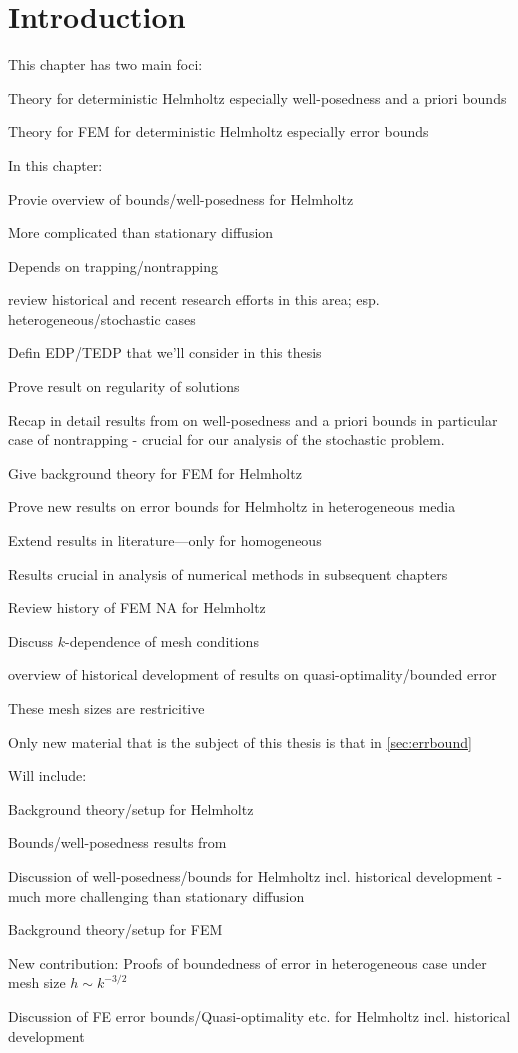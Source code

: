 \section{Introduction}
This chapter has two main foci:
\ben
\item Theory for deterministic Helmholtz especially well-posedness and a priori bounds
\item Theory for FEM for deterministic Helmholtz especially error bounds
  \een

In this chapter:
\bit
\item Provie overview of bounds/well-posedness for Helmholtz
\bit
\item More complicated than stationary diffusion
\item Depends on trapping/nontrapping
\item review historical and recent research efforts in this area; esp. heterogeneous/stochastic cases
\eit
\item Defin EDP/TEDP that we'll consider in this thesis
\item Prove result on regularity of solutions
\item Recap in detail results from \cite{GrPeSp:19} on well-posedness and a priori bounds in particular case of nontrapping - crucial for our analysis of the stochastic problem.
\item Give background theory for FEM for Helmholtz
\item Prove new results on error bounds for Helmholtz in heterogeneous media
  \bit
\item Extend results in literature---only for homogeneous
\item Results crucial in analysis of numerical methods in subsequent chapters
\eit
\item Review history of FEM NA for Helmholtz
\bit
\item Discuss $k$-dependence of mesh conditions
\item  overview of historical development of results on quasi-optimality/bounded error
\item These mesh sizes are restricitive
\eit


Only new material that is the subject of this thesis is that in \cref{sec:errbound}
\eit

Will include:
\bit
\item Background theory/setup for Helmholtz
\item Bounds/well-posedness results from \cite{GrPeSp:19}
\item Discussion of well-posedness/bounds for Helmholtz incl. historical development - much more challenging than stationary diffusion
\item Background theory/setup for FEM
\item New contribution: Proofs of boundedness of error in heterogeneous case under mesh size $h \sim k^{-3/2}$
\item Discussion of FE error bounds/Quasi-optimality etc. for Helmholtz incl. historical development
  \eit

